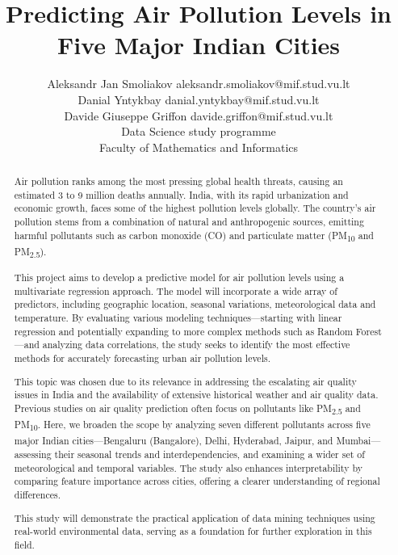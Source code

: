 \documentclass[twoside,11pt]{article}
\begin{document}
\title{Predicting Air Pollution Levels in Five Major Indian Cities}

\author{\name Aleksandr Jan Smoliakov \email aleksandr.smoliakov@mif.stud.vu.lt \\
  \name Danial Yntykbay \email danial.yntykbay@mif.stud.vu.lt \\
  \name Davide Giuseppe Griffon \email davide.griffon@mif.stud.vu.lt \\
  \addr Data Science study programme\\
       Faculty of Mathematics and Informatics}


\maketitle


\begin{abstract}

  Air pollution ranks among the most pressing global health threats, causing an estimated 3 to 9 million deaths annually.
  India, with its rapid urbanization and economic growth, faces some of the highest pollution levels globally. The country's air pollution stems from a combination of natural and anthropogenic sources, emitting harmful pollutants such as carbon monoxide (CO) and particulate matter (PM\textsubscript{10} and PM\textsubscript{2.5}).

  This project aims to develop a predictive model for air pollution levels using a multivariate regression approach. The model will incorporate a wide array of predictors, including geographic location, seasonal variations, meteorological data and temperature. By evaluating various modeling techniques—starting with linear regression and potentially expanding to more complex methods such as Random Forest—and analyzing data correlations, the study seeks to identify the most effective methods for accurately forecasting urban air pollution levels.
  
  This topic was chosen due to its relevance in addressing the escalating air quality issues in India and the availability of extensive historical weather and air quality data. Previous studies on air quality prediction often focus on pollutants like PM\textsubscript{2.5} and PM\textsubscript{10}. Here, we broaden the scope by analyzing seven different pollutants across five major Indian cities—Bengaluru (Bangalore), Delhi, Hyderabad, Jaipur, and Mumbai—assessing their seasonal trends and interdependencies, and examining a wider set of meteorological and temporal variables. The study also enhances interpretability by comparing feature importance across cities, offering a clearer understanding of regional differences.
  
  This study will demonstrate the practical application of data mining techniques using real-world environmental data, serving as a foundation for further exploration in this field.
  
\end{abstract}
\end{document}
